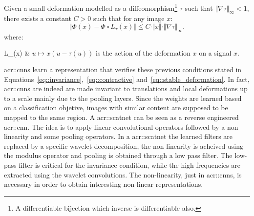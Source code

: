             Given a small deformation modelled as a diffeomorphism\footnote{A differentiable bijection which inverse is differentiable also.} $\tau$ such that $\Vert\nabla \tau\Vert_\infty < 1$, there exists a constant $C>0$ such that for any image $x$:
            \begin{equation}
                \label{eq::stable_deformation}
                \Vert \Phi(x) - \Phi\circ L_\tau(x) \Vert \leq C \cdot \Vert x\Vert \cdot \Vert\nabla \tau\Vert_\infty.
            \end{equation}
            where:
            \begin{conditions}
                L_\tau(x) & $u \mapsto x(u - \tau(u))$ is the action of the deformation $x$ on a signal $x$.
            \end{conditions}

            \glspl{acr::cnn} learn a representation that verifies these previous conditions stated in Equations~\ref{eq::invariance},~\ref{eq::contractive} and~\ref{eq::stable_deformation}.
            In fact, \glspl{acr::cnn} are indeed are made invariant to translations and local deformations up to a scale mainly due to the pooling layers.
            Since the weights are learned based on a classification objetive, images with similar content are supposed to be mapped to the same region.
            A \gls{acr::scatnet} can be seen as a reverse engineered \gls{acr::cnn}.
            The idea is to apply linear convolutional operators followed by a non-linearity and some pooling operators.
            In a \gls{acr::scatnet} the learned filters are replaced by a specific wavelet decomposition, the non-linearity is acheived using the modulus operator and pooling is obtained through a low pass filter.
            The low-pass filter is critical for the invariance condition, while the high frequencies are extracted using the wavelet convolutions.
            The non-linearity, just in \glspl{acr::cnn}, is necessary in order to obtain interesting non-linear representations.\\

